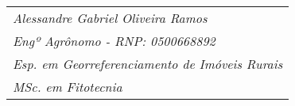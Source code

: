 \begin{flushleft}
\begin{tabular}{l}
\emph{Alessandre Gabriel Oliveira Ramos}\\
\emph{Engº Agrônomo - RNP: 0500668892}\\
\emph{Esp. em Georreferenciamento de Imóveis Rurais}\\
\emph{MSc. em Fitotecnia} \\	
\end{tabular}
\end{flushleft}